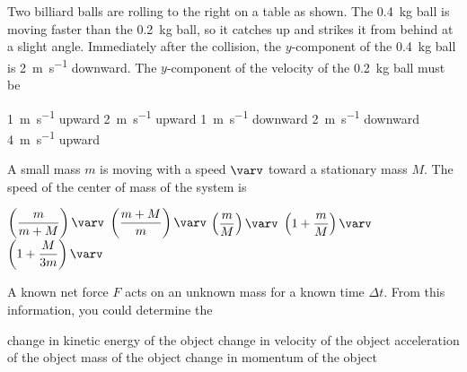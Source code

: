 \documentclass{../../oss-apphys-exam}
\begin{document}
\begin{multicols*}{2}
\begin{questions}
    \question Two billiard balls are rolling to the right on a table as shown.
    The \SI{.4}{\kilo\gram} ball is moving faster than the \SI{.2}{\kilo\gram}
    ball, so it catches up and strikes it from behind at a slight angle.
    Immediately after the collision, the $y$-component of the
    \SI{.4}{\kilo\gram} ball is \SI{2}{\metre\per\second} downward.
    The $y$-component of the velocity of the \SI{.2}{\kilo\gram} ball must be
    \begin{center}
    \end{center}
    \begin{choices}
      \choice\SI{1}{\metre\per\second} upward
      \choice\SI{2}{\metre\per\second} upward
      \choice\SI{1}{\metre\per\second} downward
      \choice\SI{2}{\metre\per\second} downward
      \choice\SI{4}{\metre\per\second} upward
    \end{choices}

    \question A small mass $m$ is moving with a speed $\varv$ toward a
    stationary mass $M$. The speed of the center of mass of the system is
    \begin{choices}
      \choice $\left(\dfrac{m}{m+M}\right)\varv$
      \choice $\left(\dfrac{m+M}{m}\right)\varv$
      \choice $\left(\dfrac{m}{M}\right)\varv$
      \choice $\left(1+\dfrac{m}{M}\right)\varv$
      \choice $\left(1+\dfrac{M}{3m}\right)\varv$
    \end{choices}

    \question A known net force $F$ acts on an unknown mass for a known time
    $\Delta t$. From this information, you could determine the
    \begin{choices}
      \choice change in kinetic energy of the object
      \choice change in velocity of the object
      \choice acceleration of the object
      \choice mass of the object
      \choice change in momentum of the object
    \end{choices}
    

\end{questions}
\end{multicols*}
\end{document}

